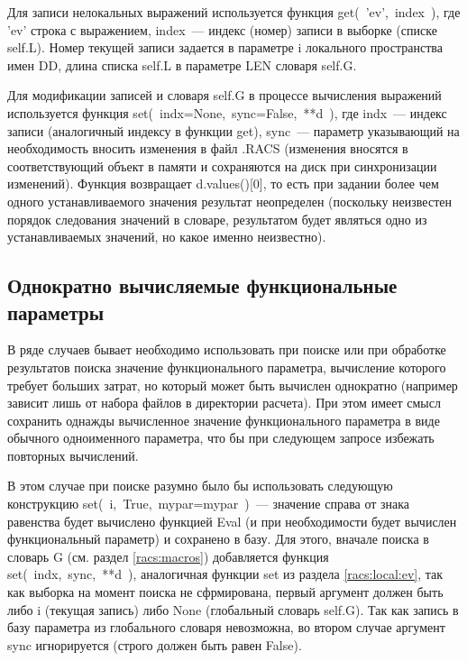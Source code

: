 Для записи нелокальных выражений используется функция 
{\sf get(~'ev',~index~)}, где {\sf 'ev'} строка с выражением, {\sf index}~--- индекс (номер)
записи в выборке (списке {\sf self.L}). Номер текущей записи задается в
параметре {\sf i} локального пространства имен {\sf DD}, длина списка {\sf
  self.L} в параметре {\sf LEN} словаря {\sf self.G}. 

Для модификации записей и словаря {\sf self.G} в процессе вычисления выражений
используется функция 
{\sf set(~indx=None,~sync=False,~**d~)}, где {\sf indx}~--- индекс записи (аналогичный индексу в функции {\sf get}), {\sf sync}~---
параметр указывающий на необходимость вносить изменения в файл {\sf .RACS}
(изменения вносятся в соответствующий объект в памяти и сохраняются на диск при
синхронизации изменений). Функция возвращает {\sf d.values()[0]}, то есть при
задании более чем одного устанавливаемого значения результат неопределен
(поскольку неизвестен порядок следования значений в словаре, результатом будет
являться одно из устанавливаемых значений, но какое именно неизвестно).


\subsection{Однократно вычисляемые функциональные параметры}
В ряде случаев бывает необходимо использовать при поиске или при обработке
результатов поиска значение функционального параметра, вычисление
которого требует больших затрат, но который может быть вычислен однократно (например зависит лишь от набора файлов в
директории расчета). При этом имеет смысл сохранить однажды вычисленное
значение функционального параметра в виде обычного одноименного параметра, что
бы при следующем запросе избежать повторных вычислений.

В этом случае при поиске разумно было бы использовать следующую конструкцию
{\sf set(~i,~True,~mypar=mypar~)}~--- значение справа от знака равенства
будет вычислено функцией {\sf Eval} (и при необходимости будет вычислен функциональный параметр)
и сохранено в базу. Для этого, вначале поиска в словарь {\sf G} (см. раздел
\ref{racs:macros}) добавляется функция {\sf set(~indx,~sync,~**d~)},
аналогичная функции {\sf set} из раздела \ref{racs:local:ev}, так как
выборка на момент поиска не сфрмирована, первый аргумент должен
быть либо {\sf i} (текущая запись) либо {\sf None} (глобальный словарь {\sf
  self.G}). Так как запись в базу параметра из глобального словаря невозможна, во
втором случае аргумент {\sf sync} игнорируется (строго должен быть равен {\sf
  False}).%
